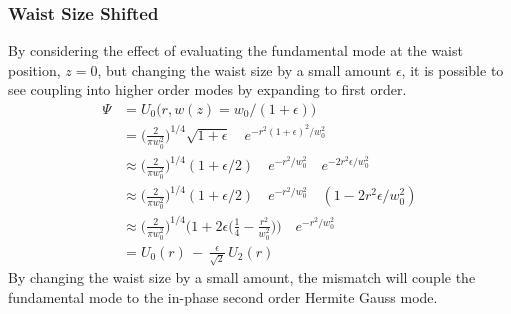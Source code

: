 		\subsubsection{Waist Size Shifted}
		By considering the effect of evaluating the fundamental mode at the waist position, $z=0$, but changing the waist size by a small amount $\epsilon$, it is possible to see coupling into higher order modes by expanding to first order.	
		\begin{equation}
		\begin{aligned}
		\Psi 	&=  		U_{0} \big(r,w(z) = w_0/(1+\epsilon) \big) 
		\\		&= 			\bigg( \frac{2}{\pi w_0^2} \bigg)^{1/4} \sqrt{1 + \epsilon} \quad e^{-r^2 (1+\epsilon)^2/w_0^2 }
		\\		&\approx 	\bigg( \frac{2}{\pi w_0^2} \bigg)^{1/4} (1 + \epsilon /2) \quad e^{-r^2/w_0^2} \quad e^{-2r^2\epsilon/w_0^2} 
		\\		&\approx 	\bigg( \frac{2}{\pi w_0^2} \bigg)^{1/4} (1 + \epsilon /2) \quad e^{-r^2/w_0^2} \quad (1-2r^2\epsilon/w_0^2)
		\\		&\approx 	\bigg( \frac{2}{\pi w_0^2} \bigg)^{1/4} \bigg(1+ 2\epsilon\bigg(\frac{1}{4} - \frac{r^2}{w_0^2}\bigg) \bigg ) \quad e^{-r^2/w_0^2}	
		\\		&=			U_0(r) \, - \, \frac{\epsilon}{\sqrt{2}} \, U_2(r)
		\end{aligned}
		\end{equation}
		By changing the waist size by a small amount, the mismatch will couple the fundamental mode to the in-phase second order Hermite Gauss mode.
		
